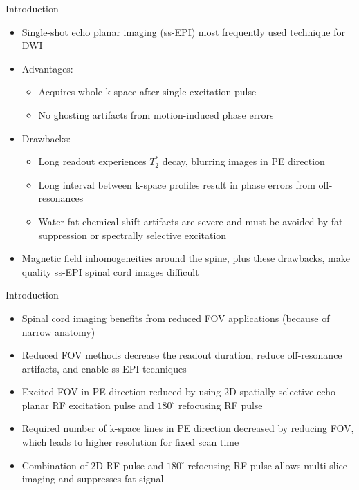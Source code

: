 \documentclass{beamer}
\begin{document}
\begin{frame}{Introduction}
\begin{itemize}
	\item Single-shot echo planar imaging (ss-EPI) most frequently used technique for DWI
	\item Advantages:
	\begin{itemize}
		\item Acquires whole k-space after single excitation pulse
		\item No ghosting artifacts from motion-induced phase errors
	\end{itemize}
	\item Drawbacks:
	\begin{itemize}
		\item Long readout experiences $T_2^*$ decay, blurring images in PE direction
		\item Long interval between k-space profiles result in phase errors from off-resonances
		\item Water-fat chemical shift artifacts are severe and must be avoided by fat suppression or spectrally selective excitation
	\end{itemize}
	\item Magnetic field inhomogeneities around the spine, plus these drawbacks, make quality ss-EPI spinal cord images difficult
\end{itemize}
\end{frame}

\begin{frame}{Introduction}
\begin{itemize}
	\item Spinal cord imaging benefits from reduced FOV applications (because of narrow anatomy)
	\item Reduced FOV methods decrease the readout duration, reduce off-resonance artifacts, and enable ss-EPI techniques
	\item Excited FOV in PE direction reduced by using 2D spatially selective echo-planar RF excitation pulse and $180^{\circ}$ refocusing RF pulse
	\item Required number of k-space lines in PE direction decreased by reducing FOV, which leads to higher resolution for fixed scan time
	\item Combination of 2D RF pulse and $180^{\circ}$ refocusing RF pulse allows multi slice imaging and suppresses fat signal
\end{itemize}
\end{frame}
	
\end{document}
